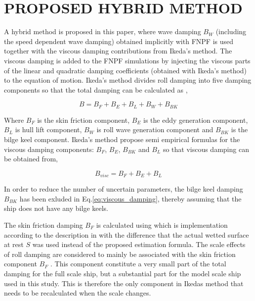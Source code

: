 \section*{PROPOSED HYBRID METHOD}\label{proposed-hybrid-method}

A hybrid method is proposed in this paper, where wave damping $B_W$
(including the speed dependent wave damping) obtained implicitly with
FNPF is used together with the viscous damping contributions from
Ikeda's method. The viscous damping is added to the FNPF simulations by
injecting the viscous parts of the linear and quadratic damping
coefficients (obtained with Ikeda's method) to the equation of motion.
Ikeda's method divides roll damping into five damping components so that
the total damping can be calculated as \citep{7505983/937PN5DT},

\begin{equation}
B = B_F + B_E + B_L + B_W + B_{BK}
\end{equation}

Where $B_F$ is the skin friction component, $B_E$ is the eddy
generation component, $B_L$ is hull lift component, $B_W$ is roll
wave generation component and $B_{BK}$ is the bilge keel component.
Ikeda's method propose semi empirical formulas for the viscous damping
components: $B_F$, $B_E$, $B_{BK}$ and $B_L$ so that viscous
damping can be obtained from,

\begin{equation}
\label{eq:viscous_damping}
B_{visc} = B_F + B_E + B_L
\end{equation}

\quad In order to reduce the number of uncertain parameters, the bilge
keel damping $B_{BK}$ has been exluded in
Eq.\ref{eq:viscous_damping}, thereby assuming that the ship does
not have any bilge keels.

\quad The skin friction damping $B_F$ is calculated using
\citep{7505983/CKCMI3N9} which is implementation according to the
description in \citep{7505983/UGK6YEVD} with the difference that the
actual wetted surface at rest $S$ was used instead of the proposed
estimation formula. The scale effects of roll damping are considered to
mainly be associated with the skin friction component $B_F$
\citep{7505983/FB64RGPF}. This component constitute a very small part of
the total damping for the full scale ship, but a substantial part for
the model scale ship used in this study. This is therefore the only
component in Ikedas method that needs to be recalculated when the scale
changes.


